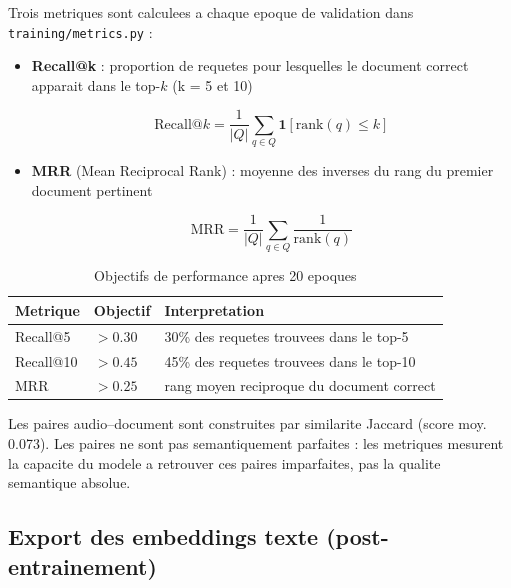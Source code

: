 \documentclass[12pt, a4paper]{article}
\begin{document}
Trois metriques sont calculees a chaque epoque de validation
dans \texttt{training/metrics.py} :

\begin{itemize}[leftmargin=1.5cm]
  \item \textbf{Recall@k} : proportion de requetes pour lesquelles le document correct
        apparait dans le top-$k$ (k = 5 et 10)

  \begin{equation}
    \text{Recall@}k = \frac{1}{|Q|}\sum_{q \in Q} \mathbf{1}\left[\text{rank}(q) \leq k\right]
  \end{equation}

  \item \textbf{MRR} (Mean Reciprocal Rank) : moyenne des inverses du rang du premier
        document pertinent

  \begin{equation}
    \text{MRR} = \frac{1}{|Q|}\sum_{q \in Q} \frac{1}{\text{rank}(q)}
  \end{equation}
\end{itemize}

\begin{table}[H]
\centering
\caption{Objectifs de performance apres 20 epoques}
\begin{tabular}{lll}
\toprule
\textbf{Metrique} & \textbf{Objectif} & \textbf{Interpretation} \\
\midrule
Recall@5  & $> 0.30$ & 30\% des requetes trouvees dans le top-5 \\
\rowcolor{silver}
Recall@10 & $> 0.45$ & 45\% des requetes trouvees dans le top-10 \\
MRR       & $> 0.25$ & rang moyen reciproque du document correct \\
\bottomrule
\end{tabular}
\end{table}

\begin{infobox}
Les paires audio--document sont construites par similarite Jaccard (score moy. 0.073).
Les paires ne sont pas semantiquement parfaites : les metriques mesurent la capacite
du modele a retrouver ces paires imparfaites, pas la qualite semantique absolue.
\end{infobox}

\subsection{Export des embeddings texte (post-entrainement)}
\end{document}
